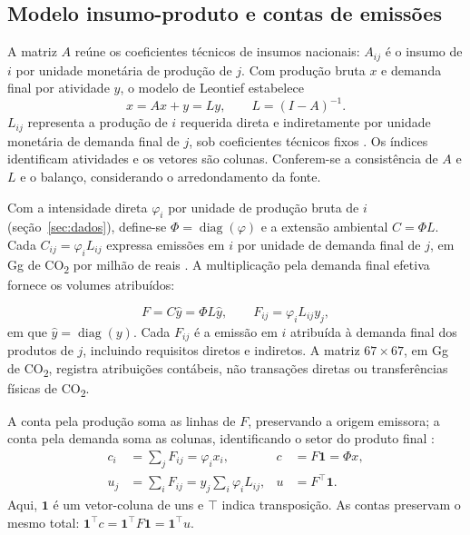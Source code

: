 \subsection{Modelo insumo-produto e contas de emissões}
\label{sec:derivacao}
\label{sec:atribuicoes}

A matriz $A$ reúne os coeficientes técnicos de insumos nacionais: $A_{ij}$ é o insumo de $i$ por unidade monetária de produção de $j$. Com produção bruta $x$ e demanda final por atividade $y$, o modelo de Leontief estabelece
\begin{equation}
x=Ax+y=Ly,\qquad L=(I-A)^{-1}.
\label{eq:leontief}
\end{equation}
$L_{ij}$ representa a produção de $i$ requerida direta e indiretamente por unidade monetária de demanda final de $j$, sob coeficientes técnicos fixos \parencite{millerBlair2009}. Os índices identificam atividades e os vetores são colunas. Conferem-se a consistência de $A$ e $L$ e o balanço, considerando o arredondamento da fonte.

Com a intensidade direta $\varphi_i$ por unidade de produção bruta de $i$ (seção~\ref{sec:dados}), define-se $\Phi=\operatorname{diag}(\varphi)$ e a extensão ambiental $C=\Phi L$. Cada $C_{ij}=\varphi_iL_{ij}$ expressa emissões em $i$ por unidade de demanda final de $j$, em Gg de CO\textsubscript{2} por milhão de reais \parencite{sanguinetAzzoni2024}. A multiplicação pela demanda final efetiva fornece os volumes atribuídos:

\begin{equation}
F=C\widehat y=\Phi L\widehat y,\qquad F_{ij}=\varphi_iL_{ij}y_j,
\label{eq:matriz-atribuicao}
\end{equation}
em que $\widehat y=\operatorname{diag}(y)$. Cada $F_{ij}$ é a emissão em $i$ atribuída à demanda final dos produtos de $j$, incluindo requisitos diretos e indiretos. A matriz $67\times67$, em Gg de CO\textsubscript{2}, registra atribuições contábeis, não transações diretas ou transferências físicas de CO\textsubscript{2}.

A conta pela produção soma as linhas de $F$, preservando a origem emissora; a conta pela demanda soma as colunas, identificando o setor do produto final \parencite{marques2012}:
\begin{align}
c_i&=\sum_jF_{ij}=\varphi_i x_i, & c&=F\mathbf{1}=\Phi x,
\label{eq:conta-producao}
\\
u_j&=\sum_iF_{ij}=y_j\sum_i\varphi_iL_{ij}, & u&=F^\top\mathbf{1}.
\label{eq:conta-demanda}
\end{align}
Aqui, $\mathbf{1}$ é um vetor-coluna de uns e $\top$ indica transposição. As contas preservam o mesmo total: $\mathbf{1}^\top c=\mathbf{1}^\top F\mathbf{1}=\mathbf{1}^\top u$.

